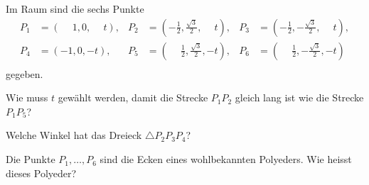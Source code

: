 Im Raum sind die sechs Punkte
\begin{align*}
P_1&=(\phantom{-}1,0,\phantom{-}t),&
	P_2&=(\textstyle-\frac12,\textstyle\frac{\sqrt{3}}2,\phantom{-}t),&
		P_3&=(\textstyle-\frac12,-\textstyle\frac{\sqrt{3}}2, \phantom{-}t),\\
P_4&=(-1,0,-t),&
	P_5&=(\textstyle\phantom{-}\frac12,\textstyle\frac{\sqrt{3}}2,-t),&
		P_6&=(\textstyle\phantom{-}\frac12,\textstyle-\frac{\sqrt{3}}2,-t)\\
\end{align*}
gegeben.
\begin{teilaufgaben}
\item
Wie muss $t$ gewählt werden, damit die Strecke $P_1P_2$ gleich lang ist
wie die Strecke $P_1P_5$?
\item
Welche Winkel hat das Dreieck $\triangle P_2P_3P_4$?
\item
Die Punkte $P_1,\dots,P_6$ sind die Ecken eines wohlbekannten Polyeders.
Wie heisst dieses Polyeder?
\end{teilaufgaben}

